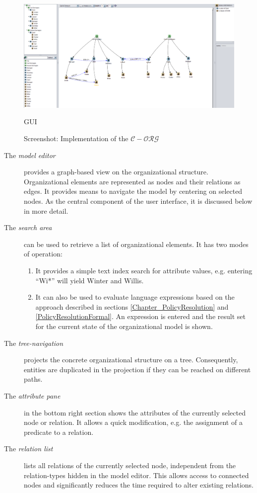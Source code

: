 \begin{figure}
\centering
\includegraphics[width=\textwidth]{Figures/corg}
\caption{Screenshot: Implementation of the $\mathcal{C-ORG}$} GUI
\label{proto-gui}
\end{figure}

\begin{description}
  \item[The \emph{model editor}] provides a graph-based view on the organizational structure. Organizational elements are represented as nodes and their relations as edges. It provides means to navigate the model by centering on selected nodes. As the central component of the user interface, it is discussed below in more detail.
	\item[The \emph{search area}] can be used to retrieve a list of organizational elements. It has two modes of operation:
	  \begin{enumerate}
		  \item It provides a simple text index search for attribute values, e.g. entering ``Wi*'' will yield Winter and Willis.
			\item It can also be used to evaluate language expressions based on the approach described in sections \ref{Chapter_PolicyResolution} and \ref{PolicyResolutionFormal}. An expression is entered and the result set for the current state of the organizational model is shown.
		\end{enumerate}
	\item[The \emph{tree-navigation}] projects the concrete organizational structure on a tree. Consequently, entities are duplicated in the projection if they can be reached on different paths.
	\item[The \emph{attribute pane}] in the bottom right section shows the attributes of the currently selected node or relation. It allows a quick modification, e.g. the assignment of a predicate to a relation.
	\item[The \emph{relation list}] lists all relations of the currently selected node, independent from the relation-types hidden in the model editor. This allows access to connected nodes and significantly reduces the time required to alter existing relations.
\end{description}

